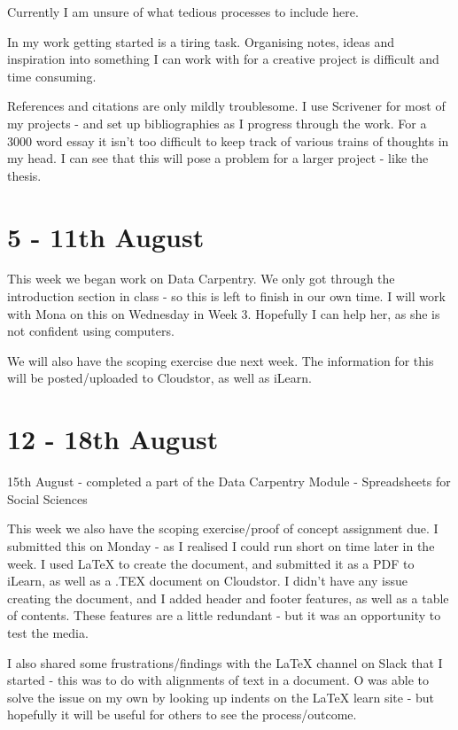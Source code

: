 \documentclass{article}
\begin{document}
Currently I am unsure of what tedious processes to include here.

In my work getting started is a tiring task. Organising notes, ideas and inspiration into something I can work with for a creative project is difficult and time consuming.

References and citations are only mildly troublesome. I use Scrivener for most of my projects - and set up bibliographies as I progress through the work. For a 3000 word essay it isn't too difficult to keep track of various trains of thoughts in my head. I can see that this will pose a problem for a larger project - like the thesis.

\section{5 - 11th August}

This week we began work on Data Carpentry. We only got through the introduction section in class - so this is left to finish in our own time. I will work with Mona on this on Wednesday in Week 3. Hopefully I can help her, as she is not confident using computers. 

We will also have the scoping exercise due next week. The information for this will be posted/uploaded to Cloudstor, as well as iLearn.



\section{12 - 18th August}

15th August - completed a part of the Data Carpentry Module - Spreadsheets for Social Sciences

This week we also have the scoping exercise/proof of concept assignment due. I submitted this on Monday - as I realised I could run short on time later in the week. 
I used LaTeX to create the document, and submitted it as a PDF to iLearn, as well as a .TEX document on Cloudstor. 
I didn't have any issue creating the document, and I added header and footer features, as well as a table of contents. These features are a little redundant - but it was an opportunity  to test the media. 

I also shared some frustrations/findings with the LaTeX channel on Slack that I started - this was to do with alignments of text in a document. O was able to solve the issue on my own by looking up indents on the LaTeX learn site - but hopefully it will be useful for others to see the process/outcome.
\end{document}
